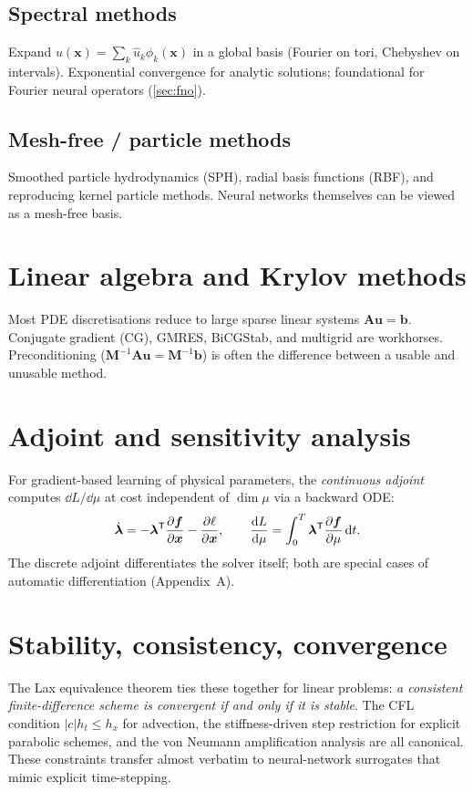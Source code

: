 \subsection{Spectral methods}
Expand $u(\bm{x})=\sum_k \hat u_k\phi_k(\bm{x})$ in a global basis
(Fourier on tori, Chebyshev on intervals). Exponential convergence
for analytic solutions; foundational for Fourier neural operators
(\cref{sec:fno}).

\subsection{Mesh-free / particle methods}
Smoothed particle hydrodynamics (SPH), radial basis functions (RBF),
and reproducing kernel particle methods. Neural networks themselves can
be viewed as a mesh-free basis.

\section{Linear algebra and Krylov methods}
Most PDE discretisations reduce to large sparse linear systems
$\bm{A}\bm{u}=\bm{b}$. Conjugate gradient (CG), GMRES, BiCGStab, and
multigrid are workhorses. Preconditioning ($\bm{M}^{-1}\bm{A}\bm{u}=
\bm{M}^{-1}\bm{b}$) is often the difference between a usable and
unusable method.

\section{Adjoint and sensitivity analysis}
For gradient-based learning of physical parameters, the
\emph{continuous adjoint} computes
$\dd L/\dd\mu$ at cost independent of $\dim\mu$ via a backward ODE:
\begin{equation}
\dot{\bm{\lambda}} = -\bm{\lambda}^{\mathsf{T}} \frac{\partial \bm{f}}{\partial \bm{x}} - \frac{\partial \ell}{\partial \bm{x}},\qquad
\frac{\mathrm{d} L}{\mathrm{d} \mu} = \int_0^T \bm{\lambda}^{\mathsf{T}} \frac{\partial \bm{f}}{\partial \mu}\,\mathrm{d} t.
\end{equation}
The discrete adjoint differentiates the solver itself; both are special
cases of automatic differentiation (Appendix~A).

\section{Stability, consistency, convergence}
The Lax equivalence theorem ties these together for linear problems:
\emph{a consistent finite-difference scheme is convergent if and only
if it is stable}. The CFL condition $|c|h_t\le h_x$ for advection,
the stiffness-driven step restriction for explicit parabolic
schemes, and the von Neumann amplification analysis are all canonical.
These constraints transfer almost verbatim to neural-network surrogates
that mimic explicit time-stepping.

